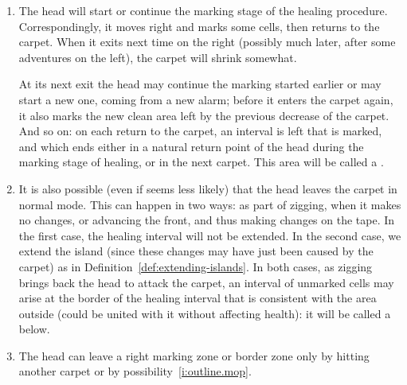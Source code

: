 \documentclass[12pt]{memoir}
\begin{document}
\begin{enumerate}
\item\label{i:outline.mark} The head will start or continue the marking stage of 
the healing procedure.
Correspondingly, it moves right and marks some cells, then returns to the carpet.
When it exits next time on the right 
(possibly much later, after some adventures on the left), the carpet will shrink somewhat.

At its next exit the head may continue the marking started earlier or may start a new one,
coming from a new alarm; before it enters the carpet again, it also 
marks the new clean area left by the previous decrease of the carpet.
And so on: on each return to the carpet, an interval is left that is marked,
and which ends either in a natural return point of the head during the marking
stage of healing, or in the next carpet.
This area will be called a .

\item\label{i:outline.border-zone} 
It is also possible (even if seems less likely) that the head leaves the carpet
in normal mode.
This can happen in two ways: as part of zigging, when it makes no changes,
or advancing the front, and thus making changes on the tape.
In the first case, the healing interval will not be extended.
In the second case, we extend the island (since these changes may have
just been caused by the carpet) as in Definition~\ref{def:extending-islands}.
In both cases, as zigging brings back the head to attack the carpet,
an interval of unmarked cells may arise at the border of the healing
interval that is consistent with the area outside (could be united with it without
affecting health): it will be called a  below.

\item\label{i:outline.leaving-marking}
The head can leave a right marking zone or border zone only by hitting another carpet
or by possibility~\ref{i:outline.mop}.


\end{enumerate}
\end{document}
